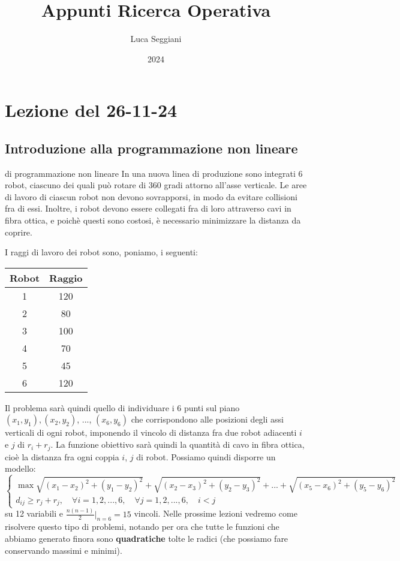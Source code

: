 \documentclass[a4paper,11pt]{article}
\title{Appunti Ricerca Operativa}
\author{Luca Seggiani}
\date{2024}
\begin{document}
\section{Lezione del 26-11-24}

\thispagestyle{empty}
\pagestyle{fancy}

\subsection{Introduzione alla programmazione non lineare}
\begin{problem}{di programmazione non lineare}
	In una nuova linea di produzione sono integrati 6 robot, ciascuno dei quali può rotare di 360 gradi attorno all'asse verticale.
	Le aree di lavoro di ciascun robot non devono sovrapporsi, in modo da evitare collisioni fra di essi.
	Inoltre, i robot devono essere collegati fra di loro attraverso cavi in fibra ottica, e poichè questi sono costosi, è necessario minimizzare la distanza da coprire.
\end{problem}

I raggi di lavoro dei robot sono, poniamo, i seguenti:
\begin{table}[h!]
	\center {}
	\begin{tabular} { c | c  }
		\bfseries Robot & \bfseries Raggio  \\
		\hline 
		 1 & 120 \\ 
		 2 & 80 \\ 
		 3 & 100 \\ 
		 4 & 70 \\ 
		 5 & 45 \\ 
		 6 & 120
	\end{tabular}
\end{table}

Il problema sarà quindi quello di individuare i 6 punti sul piano $(x_1, y_1), (x_2, y_2)$, $...$, $(x_6, y_6)$ che corrispondono alle posizioni degli assi verticali di ogni robot, imponendo il vincolo di distanza fra due robot adiacenti $i$ e $j$ di $r_i + r_j$.
La funzione obiettivo sarà quindi la quantità di cavo in fibra ottica, cioè la distanza fra ogni coppia $i$, $j$ di robot.
Possiamo quindi disporre un modello:
\[
	\begin{cases}
		\max \sqrt{(x_1 - x_2)^2 + (y_1 - y_2)^2} + \sqrt{(x_2 - x_3)^2 + (y_2 - y_3)^2} + ... + \sqrt{(x_5 - x_6)^2 + (y_5 - y_6)^2} \\ 
		d_{ij} \geq r_j + r_j, \quad \forall i = 1, 2, ..., 6, \quad \forall j = 1, 2, ..., 6, \quad i < j
	\end{cases}
\]
su 12 variabili e $\frac{n(n-1)}{2} \big|_{n=6} = 15$ vincoli.
Nelle prossime lezioni vedremo come risolvere questo tipo di problemi, notando per ora che tutte le funzioni che abbiamo generato finora sono \textbf{quadratiche} tolte le radici (che possiamo fare conservando massimi e minimi).
\end{document}
